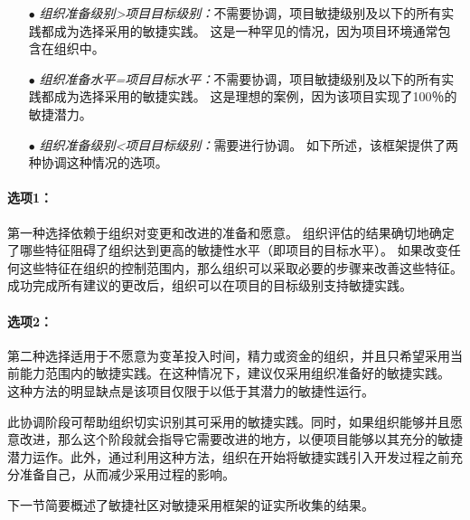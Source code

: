\documentclass[twocolumn]{svjour3}[]
\begin{document}
\begin{itemize}
    \item[$\bullet$] \textit{组织准备级别>项目目标级别：}不需要协调，项目敏捷级别及以下的所有实践都成为选择采用的敏捷实践。 这是一种罕见的情况，因为项目环境通常包含在组织中。
    \item[$\bullet$] \textit{组织准备水平=项目目标水平：}不需要协调，项目敏捷级别及以下的所有实践都成为选择采用的敏捷实践。 这是理想的案例，因为该项目实现了100％的敏捷潜力。
    \item[$\bullet$] \textit{组织准备级别<项目目标级别：}需要进行协调。 如下所述，该框架提供了两种协调这种情况的选项。
\end{itemize}

\paragraph{选项1：}

第一种选择依赖于组织对变更和改进的准备和愿意。 组织评估的结果确切地确定了哪些特征阻碍了组织达到更高的敏捷性水平（即项目的目标水平）。 如果改变任何这些特征在组织的控制范围内，那么组织可以采取必要的步骤来改善这些特征。 成功完成所有建议的更改后，组织可以在项目的目标级别支持敏捷实践。

\paragraph{选项2：}

第二种选择适用于不愿意为变革投入时间，精力或资金的组织，并且只希望采用当前能力范围内的敏捷实践。在这种情况下，建议仅采用组织准备好的敏捷实践。 这种方法的明显缺点是该项目仅限于以低于其潜力的敏捷性运行。

此协调阶段可帮助组织切实识别其可采用的敏捷实践。同时，如果组织能够并且愿意改进，那么这个阶段就会指导它需要改进的地方，以便项目能够以其充分的敏捷潜力运作。此外，通过利用这种方法，组织在开始将敏捷实践引入开发过程之前充分准备自己，从而减少采用过程的影响。

下一节简要概述了敏捷社区对敏捷采用框架的证实所收集的结果。



\end{document}
